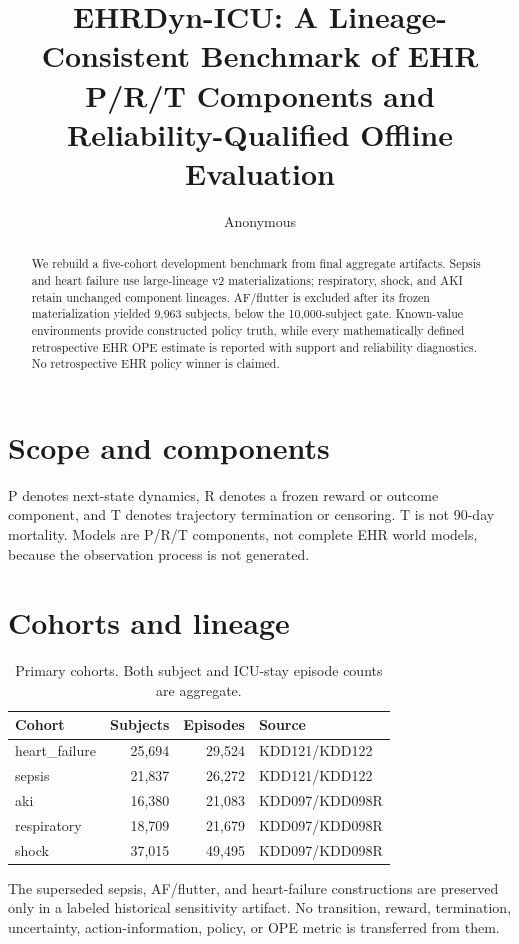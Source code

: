 \documentclass[10pt]{article}
\title{EHRDyn-ICU: A Lineage-Consistent Benchmark of EHR P/R/T Components and Reliability-Qualified Offline Evaluation}
\author{Anonymous}
\date{}
\begin{document}
\maketitle
\begin{abstract}
We rebuild a five-cohort development benchmark from final aggregate artifacts. Sepsis and heart failure use large-lineage v2 materializations; respiratory, shock, and AKI retain unchanged component lineages. AF/flutter is excluded after its frozen materialization yielded 9,963 subjects, below the 10,000-subject gate. Known-value environments provide constructed policy truth, while every mathematically defined retrospective EHR OPE estimate is reported with support and reliability diagnostics. No retrospective EHR policy winner is claimed.
\end{abstract}
\section{Scope and components}
P denotes next-state dynamics, R denotes a frozen reward or outcome component, and T denotes trajectory termination or censoring. T is not 90-day mortality. Models are P/R/T components, not complete EHR world models, because the observation process is not generated.
\section{Cohorts and lineage}
\begin{table}[h]\centering\caption{Primary cohorts. Both subject and ICU-stay episode counts are aggregate.}\begin{tabular}{lrrl}\toprule Cohort & Subjects & Episodes & Source \\\midrule
heart\_failure & 25,694 & 29,524 & KDD121/KDD122 \\
sepsis & 21,837 & 26,272 & KDD121/KDD122 \\
aki & 16,380 & 21,083 & KDD097/KDD098R \\
respiratory & 18,709 & 21,679 & KDD097/KDD098R \\
shock & 37,015 & 49,495 & KDD097/KDD098R \\
\bottomrule\end{tabular}\end{table}
The superseded sepsis, AF/flutter, and heart-failure constructions are preserved only in a labeled historical sensitivity artifact. No transition, reward, termination, uncertainty, action-information, policy, or OPE metric is transferred from them.
\end{document}
